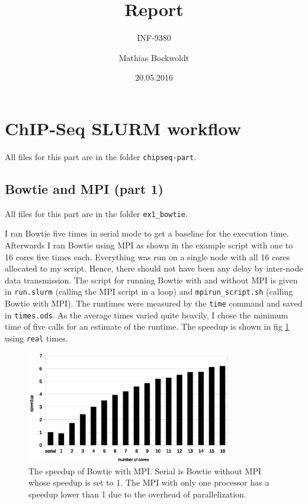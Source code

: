 \documentclass[paper=a4, 12pt]{scrartcl}
\begin{document}
\title{Report}
\subtitle{INF-9380}
\author{Mathias Bockwoldt}
\date{20.05.2016}

\maketitle

\onehalfspacing

\section{ChIP-Seq SLURM workflow}

All files for this part are in the folder \texttt{chipseq-part}.

\subsection{Bowtie and MPI (part 1)}

All files for this part are in the folder \texttt{ex1\_bowtie}.

I ran Bowtie five times in serial mode to get a baseline for the execution time. Afterwards I ran Bowtie using MPI as shown in the example script with one to 16 cores five times each. Everything was run on a single node with all 16 cores allocated to my script. Hence, there should not have been any delay by inter-node data transmission. The script for running Bowtie with and without MPI is given in \texttt{run.slurm} (calling the MPI script in a loop) and \texttt{mpirun\_script.sh} (calling Bowtie with MPI). The runtimes were measured by the \texttt{time} command and saved in \texttt{times.ods}. As the average times varied quite heavily, I chose the minimum time of five calls for an estimate of the runtime. The speedup is shown in fig \ref{fig:chipseq-bowtie} using \texttt{real} times.

\begin{figure}[ht]
	\centering
		\includegraphics[width=0.8\textwidth]{chipseq-bowtie}
	\caption{The speedup of Bowtie with MPI. Serial is Bowtie without MPI whose speedup is set to 1. The MPI with only one processor has a speedup lower than 1 due to the overhead of parallelization.}
	\label{fig:chipseq-bowtie}
\end{figure}
\end{document}
